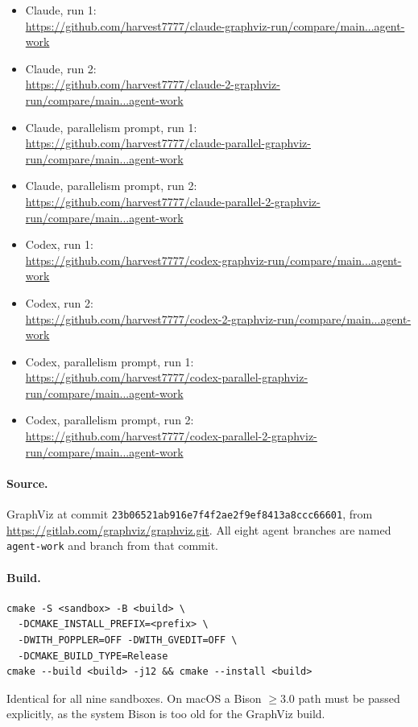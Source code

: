 \begin{itemize}
\item Claude, run 1: \\
      \url{https://github.com/harvest7777/claude-graphviz-run/compare/main...agent-work}
\item Claude, run 2: \\
      \url{https://github.com/harvest7777/claude-2-graphviz-run/compare/main...agent-work}
\item Claude, parallelism prompt, run 1: \\
      \url{https://github.com/harvest7777/claude-parallel-graphviz-run/compare/main...agent-work}
\item Claude, parallelism prompt, run 2: \\
      \url{https://github.com/harvest7777/claude-parallel-2-graphviz-run/compare/main...agent-work}
\item Codex, run 1: \\
      \url{https://github.com/harvest7777/codex-graphviz-run/compare/main...agent-work}
\item Codex, run 2: \\
      \url{https://github.com/harvest7777/codex-2-graphviz-run/compare/main...agent-work}
\item Codex, parallelism prompt, run 1: \\
      \url{https://github.com/harvest7777/codex-parallel-graphviz-run/compare/main...agent-work}
\item Codex, parallelism prompt, run 2: \\
      \url{https://github.com/harvest7777/codex-parallel-2-graphviz-run/compare/main...agent-work}
\end{itemize}

\paragraph{Source.}
GraphViz at commit
\texttt{23b06521ab916e7f4f2ae2f9ef8413a8ccc66601}, from
\url{https://gitlab.com/graphviz/graphviz.git}. All eight agent branches are named
\texttt{agent-work} and branch from that commit.

\paragraph{Build.}
\begin{verbatim}
cmake -S <sandbox> -B <build> \
  -DCMAKE_INSTALL_PREFIX=<prefix> \
  -DWITH_POPPLER=OFF -DWITH_GVEDIT=OFF \
  -DCMAKE_BUILD_TYPE=Release
cmake --build <build> -j12 && cmake --install <build>
\end{verbatim}
Identical for all nine sandboxes. On macOS a Bison $\geq 3.0$ path must be
passed explicitly, as the system Bison is too old for the GraphViz build.

